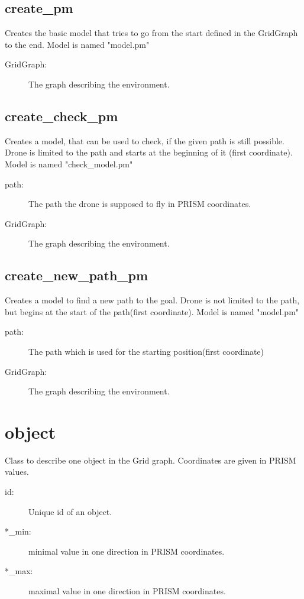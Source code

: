 \documentclass{article}
\begin{document}
\subsection{create\_pm}
Creates the basic model that tries to go from the start defined in the GridGraph to the end. Model is named "model.pm"

\begin{description}
    \item[GridGraph:] The graph describing the environment.
\end{description}

\subsection{create\_check\_pm}
Creates a model, that can be used to check, if the given path is still possible. Drone is limited to the path and starts at the beginning of it (first coordinate). Model is named "check\_model.pm"

\begin{description}
    \item[path:] The path the drone is supposed to fly in PRISM coordinates.
    \item[GridGraph:] The graph describing the environment.
\end{description}

\subsection{create\_new\_path\_pm}
Creates a model to find a new path to the goal. Drone is not limited to the path, but begins at the start of the path(first coordinate). Model is named "model.pm"

\begin{description}
    \item[path:] The path which is used for the starting position(first coordinate)
    \item[GridGraph:] The graph describing the environment.
\end{description}

\section{object}
Class to describe one object in the Grid graph. Coordinates are given in PRISM values.

\begin{description}
    \item[id:] Unique id of an object.
    \item[*\_min:] minimal value in one direction in PRISM coordinates.
    \item[*\_max:] maximal value in one direction in PRISM coordinates.
\end{description}
\end{document}
